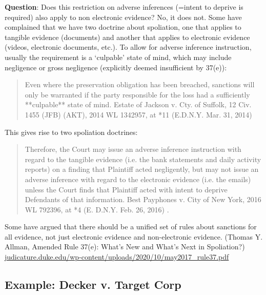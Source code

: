 \documentclass[
  10pt,
  dvipsnames,enabledeprecatedfontcommands]{scrartcl}
\begin{document}
\textbf{Question}: Does this restriction on adverse inferences (=intent
to deprive is required) also apply to non electronic evidence? No, it
does not. Some have complained that we have two doctrine about
spoliation, one that applies to tangible evidence (documents) and
another that applies to electronic evidence (videos, electronic
documents, etc.). To allow for adverse inference instruction, usually
the requirement is a `culpable' state of mind, which may include
negligence or gross negligence (explicitly deemed insufficient by
37(e)):

\begin{quote}
Even where the preservation obligation has been breached, sanctions will only be warranted if the party responsible for the loss had a sufficiently **culpable** state of mind.  Estate of Jackson v. Cty. of Suffolk, 12 Civ. 1455 (JFB) (AKT), 2014 WL 1342957, at *11 (E.D.N.Y. Mar. 31, 2014)
\end{quote}

This gives rise to two spoliation doctrines:

\begin{quote}
Therefore, the Court may issue an adverse inference instruction with regard to the tangible evidence (i.e. the bank statements and daily activity reports) on a finding that Plaintiff acted negligently, but may not issue an adverse inference with regard to the electronic evidence (i.e. the emails) unless the Court finds that Plaintiff acted with intent to deprive Defendants of that information. Best Payphones v. City of New York, 2016 WL 792396, at *4 (E. D.N.Y. Feb. 26, 2016) .
\end{quote}

Some have argued that there should be a unified set of rules about
sanctions for all evidence, not just electronic evidence and
non-electronic evidence. (Thomas Y. Allman, Amended Rule 37(e): What's
New and What's Next in Spoliation?)
\url{judicature.duke.edu/wp-content/uploads/2020/10/may2017_rule37.pdf}


\hypertarget{example-decker-v.-target-corp}{%
\subsection{Example: Decker v. Target
Corp}\label{example-decker-v.-target-corp}}
\end{document}
